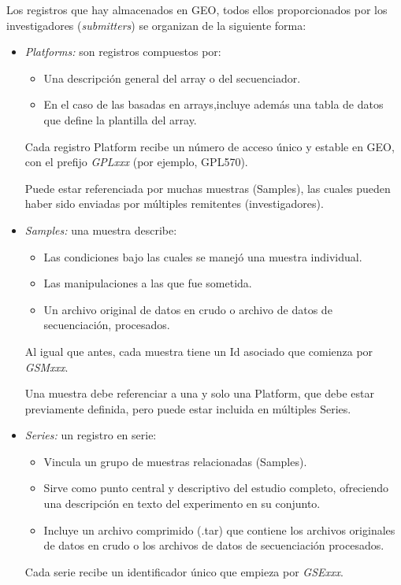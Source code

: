 Los registros que hay almacenados en GEO, todos ellos proporcionados por los investigadores (\textit{submitters}) se organizan de la siguiente forma:

\begin{itemize}
    \item \textit{Platforms: } son registros compuestos por:
    \begin{itemize}
        \item Una descripción general del array o del secuenciador.
        \item En el caso de las basadas en arrays,incluye además una tabla de datos que define la plantilla del array.
    \end{itemize} 

        Cada registro Platform recibe un número de acceso único y estable en GEO, con el prefijo \textit{GPLxxx} (por ejemplo, GPL570). \newline

        Puede estar referenciada por muchas muestras (Samples), las cuales pueden haber sido enviadas por múltiples remitentes (investigadores).

    \item \textit{Samples: } una muestra describe:
    \begin{itemize}
        \item Las condiciones bajo las cuales se manejó una muestra individual.
        \item Las manipulaciones a las que fue sometida.
        \item Un archivo original de datos en crudo o archivo de datos de secuenciación, procesados.
    \end{itemize}
    Al igual que antes, cada muestra tiene un Id asociado que comienza por \textit{GSMxxx}. \newline

    Una muestra debe referenciar a una y solo una Platform, que debe estar previamente definida, pero puede estar incluida en múltiples Series.
    
    \item \textit{Series: } un registro en serie:
    \begin{itemize}
        \item Vincula un grupo de muestras relacionadas (Samples).
        \item Sirve como punto central y descriptivo del estudio completo, ofreciendo una descripción en texto del experimento en su conjunto.
        \item Incluye un archivo comprimido (.tar) que contiene los archivos originales de datos en crudo o los archivos de datos de secuenciación
        procesados.
    \end{itemize}

    Cada serie recibe un identificador único que empieza por \textit{GSExxx}.
\end{itemize}

